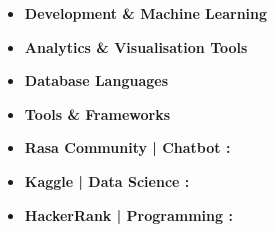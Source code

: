
\begin{itemize}
\item\bf{Development \& Machine Learning}
\item\bf{Analytics \& Visualisation Tools}
\item\bf{Database Languages}
\item\bf{Tools \& Frameworks}
\end{itemize}




\begin{itemize}
\item\bf{Rasa Community | Chatbot :}\normalfont{}
\item\bf{Kaggle | Data Science :}\normalfont{}
\item\bf{HackerRank | Programming :}\normalfont{}
\end{itemize}


